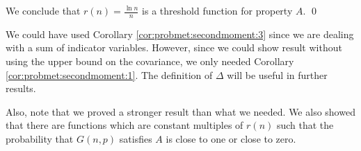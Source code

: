 We conclude that $r(n) = \frac{\ln n}{n}$ is a threshold function for property $A$. \qed \par
We could have used Corollary \ref{cor:probmet:secondmoment:3} since we are dealing with a sum of indicator variables. However, since we could show result without using the upper bound on the covariance, we only needed Corollary \ref{cor:probmet:secondmoment:1}. The definition of $\Delta$ will be useful in further results. \par 
Also, note that we proved a stronger result than what we needed. We also showed that there are functions which are constant multiples of $r(n)$ such that the probability that $G(n, p)$ satisfies $A$ is close to one or close to zero. \par
